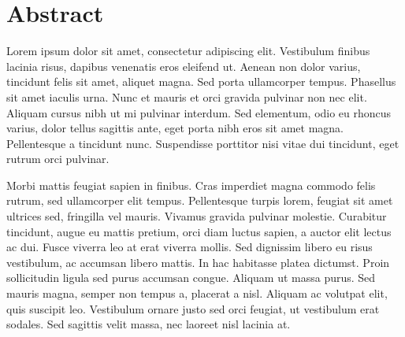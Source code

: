 \chapter*{Abstract}

Lorem ipsum dolor sit amet, consectetur adipiscing elit. Vestibulum finibus lacinia risus, dapibus venenatis eros eleifend ut. Aenean non dolor varius, tincidunt felis sit amet, aliquet magna. Sed porta ullamcorper tempus. Phasellus sit amet iaculis urna. Nunc et mauris et orci gravida pulvinar non nec elit. Aliquam cursus nibh ut mi pulvinar interdum. Sed elementum, odio eu rhoncus varius, dolor tellus sagittis ante, eget porta nibh eros sit amet magna. Pellentesque a tincidunt nunc. Suspendisse porttitor nisi vitae dui tincidunt, eget rutrum orci pulvinar.

Morbi mattis feugiat sapien in finibus. Cras imperdiet magna commodo felis rutrum, sed ullamcorper elit tempus. Pellentesque turpis lorem, feugiat sit amet ultrices sed, fringilla vel mauris. Vivamus gravida pulvinar molestie. Curabitur tincidunt, augue eu mattis pretium, orci diam luctus sapien, a auctor elit lectus ac dui. Fusce viverra leo at erat viverra mollis. Sed dignissim libero eu risus vestibulum, ac accumsan libero mattis. In hac habitasse platea dictumst. Proin sollicitudin ligula sed purus accumsan congue. Aliquam ut massa purus. Sed mauris magna, semper non tempus a, placerat a nisl. Aliquam ac volutpat elit, quis suscipit leo. Vestibulum ornare justo sed orci feugiat, ut vestibulum erat sodales. Sed sagittis velit massa, nec laoreet nisl lacinia at.

\cleardoublepage